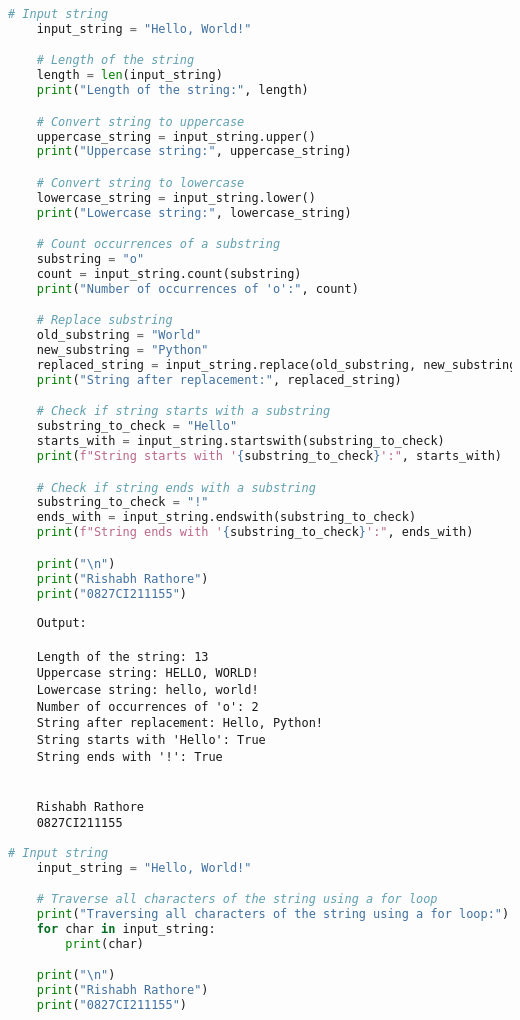 \documentclass{report}
\begin{document}
\sol{}
\begin{lstlisting}[language=Python]
	# Input string
	input_string = "Hello, World!"

	# Length of the string
	length = len(input_string)
	print("Length of the string:", length)

	# Convert string to uppercase
	uppercase_string = input_string.upper()
	print("Uppercase string:", uppercase_string)

	# Convert string to lowercase
	lowercase_string = input_string.lower()
	print("Lowercase string:", lowercase_string)

	# Count occurrences of a substring
	substring = "o"
	count = input_string.count(substring)
	print("Number of occurrences of 'o':", count)

	# Replace substring
	old_substring = "World"
	new_substring = "Python"
	replaced_string = input_string.replace(old_substring, new_substring)
	print("String after replacement:", replaced_string)

	# Check if string starts with a substring
	substring_to_check = "Hello"
	starts_with = input_string.startswith(substring_to_check)
	print(f"String starts with '{substring_to_check}':", starts_with)

	# Check if string ends with a substring
	substring_to_check = "!"
	ends_with = input_string.endswith(substring_to_check)
	print(f"String ends with '{substring_to_check}':", ends_with)

	print("\n")
	print("Rishabh Rathore")
	print("0827CI211155")
\end{lstlisting}

\begin{verbatim}
	Output:

	Length of the string: 13
	Uppercase string: HELLO, WORLD!
	Lowercase string: hello, world!
	Number of occurrences of 'o': 2
	String after replacement: Hello, Python!
	String starts with 'Hello': True
	String ends with '!': True
	
	
	Rishabh Rathore
	0827CI211155
\end{verbatim}
\newpage


\sol{}
\begin{lstlisting}[language=Python]
	# Input string
	input_string = "Hello, World!"

	# Traverse all characters of the string using a for loop
	print("Traversing all characters of the string using a for loop:")
	for char in input_string:
		print(char)

	print("\n")
	print("Rishabh Rathore")
	print("0827CI211155")
\end{lstlisting}
\end{document}
